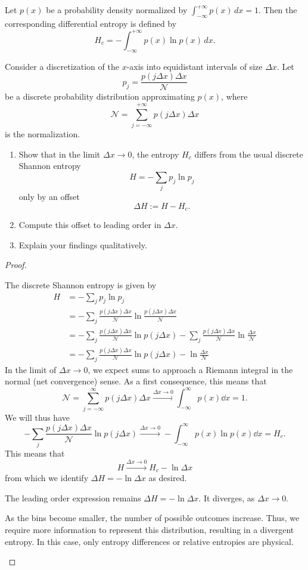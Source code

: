 \begin{Problem}
Let \(p(x)\) be a probability density normalized by $\int_{-\infty}^{+\infty} p(x)\,dx =1$. Then the corresponding differential entropy is defined by
\[
H_c
=
-\int_{-\infty}^{+\infty}
p(x)\ln p(x)\,dx.
\]

Consider a discretization of the \(x\)-axis into equidistant
intervals of size \(\Delta x\). Let
\[
p_j
=
\frac{p(j\Delta x)\Delta x}{\mathcal N}
\]
be a discrete probability distribution approximating \(p(x)\),
where
\[
\mathcal N
=
\sum_{j=-\infty}^{+\infty}
p(j\Delta x)\Delta x
\]
is the normalization.

\begin{enumerate}
\item[(a)] Show that in the limit \(\Delta x\to0\), the entropy
\(H_c\) differs from the usual discrete Shannon entropy
\[
H
=
-\sum_j p_j\ln p_j
\]
only by an offset
\[
\Delta H:=H-H_c.
\]

\item[(b)] Compute this offset to leading order in \(\Delta x\).

\item[(c)] Explain your findings qualitatively.
\end{enumerate}
\end{Problem}
\begin{proof}
	\begin{parts}
	\item The discrete Shannon entropy is given by
		\begin{align*}
			H &= -\sum_j p_j \ln p_j \\
			&= -\sum_j \frac{p(j\Delta x)\Delta x}{\mathcal{N}}\ln \frac{p(j\Delta x)\Delta x}{\mathcal{N}} \\
			&= -\sum_j \frac{p(j\Delta x)\Delta x}{\mathcal{N}} \ln p(j\Delta x) - \sum_j \frac{p(j\Delta x)\Delta x}{\mathcal{N}}\ln \frac{\Delta x}{\mathcal{N}} \\
			&= -\sum_j \frac{p(j\Delta x)\Delta x}{\mathcal{N}} \ln p(j\Delta x) - \ln \frac{\Delta x}{\mathcal{N}} 
		\end{align*}
		In the limit of $\Delta x\to 0$, we expect sums to approach a Riemann integral in the normal (net convergence) sense. As a first consequence, this means that
		\[
			\mathcal{N}=\sum_{j=-\infty}^{\infty} p(j\Delta x)\Delta x \xrightarrow{\Delta x \to 0}\int_{-\infty}^\infty p(x)\dd{x} = 1 
		.\] 
		We will thus have
		\[
			-\sum_j \frac{p(j\Delta x)\Delta x}{\mathcal{N}}\ln p(j\Delta x)\xrightarrow{\Delta x \to 0}-\int_{-\infty}^\infty p(x)\ln p(x)\dd{x}=H_c 
		.\] 
		This means that
		\[
			H\xrightarrow{\Delta x \to 0}H_c - \ln \Delta x
		\] 
		from which we identify $\Delta H = -\ln \Delta x$ as desired.
	\item The leading order expression remains $\Delta H = -\ln \Delta x$. It diverges, as $\Delta x \to 0$.
	\item As the bins become smaller, the number of possible outcomes increase. Thus, we require more information to represent this distribution, resulting in a divergent entropy. In this case, only entropy differences or relative entropies are physical.\qedhere
	\end{parts}
\end{proof}
